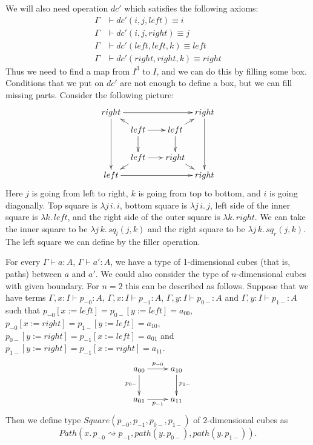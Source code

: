 \documentclass{mscs}
\newcommand{\deq}{\equiv}
\newcommand{\repl}{:=}
\newcommand{\idtype}{\rightsquigarrow}
\numberwithin{figure}{section}
\begin{document}
We will also need operation $dc'$ which satisfies the following axioms:
\begin{align*}
\Gamma & \vdash dc'(i,j,left) \deq i \\
\Gamma & \vdash dc'(i,j,right) \deq j \\
\Gamma & \vdash dc'(left,left,k) \deq left \\
\Gamma & \vdash dc'(right,right,k) \deq right
\end{align*}
Thus we need to find a map from $I^3$ to $I$, and we can do this by filling some box.
Conditions that we put on $dc'$ are not enough to define a box, but we can fill missing parts.
Consider the following picture:
\[ \xymatrix @C=0.5pc @R=0.5pc
    { right \ar[rrrr] \ar[dddd] &         & &                      & right \ar[dddd] \\
           & left \ar[rr] \ar[dd] \ar[ul] & & left \ar[dd] \ar[ur] & \\
           &                              & &                      & \\
           & left \ar[rr] \ar[dl]         & & right \ar[dr]        & \\
      left \ar[rrrr]           &          & &                      & right
    }\]
Here $j$ is going from left to right, $k$ is going from top to bottom, and $i$ is going diagonally.
Top square is $\lambda j\,i.\,i$, bottom square is $\lambda j\,i.\,j$, left side of the inner square is $\lambda k.\,left$,
and the right side of the outer square is $\lambda k.\,right$.
We can take the inner square to be $\lambda j\,k.\,sq_l(j,k)$ and the right square to be $\lambda j\,k.\,sq_r(j,k)$.
The left square we can define by the filler operation.

For every $\Gamma \vdash a : A$, $\Gamma \vdash a' : A$, we have a type of 1-dimensional cubes (that is, paths) between $a$ and $a'$.
We could also consider the type of $n$-dimensional cubes with given boundary.
For $n = 2$ this can be described as follows.
Suppose that we have terms $\Gamma, x : I \vdash p_{-0} : A$, $\Gamma, x : I \vdash p_{-1} : A$, $\Gamma, y : I \vdash p_{0-} : A$ and $\Gamma, y : I \vdash p_{1-} : A$
such that $p_{-0}[x \repl left] = p_{0-}[y \repl left] = a_{00}$, $p_{-0}[x \repl right] = p_{1-}[y \repl left] = a_{10}$,
$p_{0-}[y \repl right] = p_{-1}[x \repl left] = a_{01}$ and $p_{1-}[y \repl right] = p_{-1}[x \repl right] = a_{11}$.
\[ \xymatrix{ a_{00} \ar[r]^{p_{-0}} \ar[d]_{p_{0-}} & a_{10} \ar[d]^{p_{1-}} \\
              a_{01} \ar[r]_{p_{-1}}                 & a_{11}
            } \]
Then we define type $Square(p_{-0},p_{-1},p_{0-},p_{1-})$ of 2-dimensional cubes as
\[ Path(x.\,p_{-0} \idtype p_{-1}, path(y.\,p_{0-}), path(y.\,p_{1-})). \]
\end{document}
